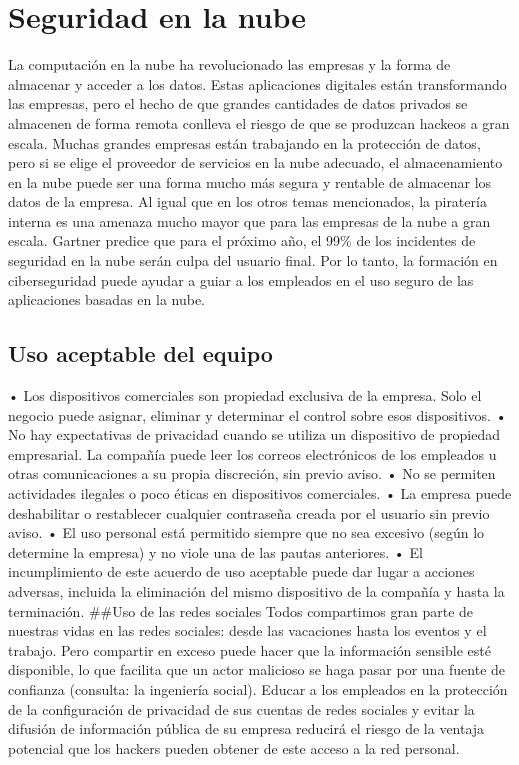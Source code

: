 \documentclass[
]{article}
\begin{document}
\hypertarget{seguridad-en-la-nube}{%
\section{Seguridad en la nube}\label{seguridad-en-la-nube}}

La computación en la nube ha revolucionado las empresas y la forma de almacenar y acceder a los datos. Estas aplicaciones digitales están transformando las empresas, pero el hecho de que grandes cantidades de datos privados se almacenen de forma remota conlleva el riesgo de que se produzcan hackeos a gran escala. Muchas grandes empresas están trabajando en la protección de datos, pero si se elige el proveedor de servicios en la nube adecuado, el almacenamiento en la nube puede ser una forma mucho más segura y rentable de almacenar los datos de la empresa.
Al igual que en los otros temas mencionados, la piratería interna es una amenaza mucho mayor que para las empresas de la nube a gran escala. Gartner predice que para el próximo año, el 99\% de los incidentes de seguridad en la nube serán culpa del usuario final. Por lo tanto, la formación en ciberseguridad puede ayudar a guiar a los empleados en el uso seguro de las aplicaciones basadas en la nube.

\hypertarget{uso-aceptable-del-equipo}{%
\subsection{Uso aceptable del equipo}\label{uso-aceptable-del-equipo}}

• Los dispositivos comerciales son propiedad exclusiva de la empresa. Solo el negocio puede asignar, eliminar y determinar el control sobre esos dispositivos.
• No hay expectativas de privacidad cuando se utiliza un dispositivo de propiedad empresarial. La compañía puede leer los correos electrónicos de los empleados u otras comunicaciones a su propia discreción, sin previo aviso.
• No se permiten actividades ilegales o poco éticas en dispositivos comerciales.
• La empresa puede deshabilitar o restablecer cualquier contraseña creada por el usuario sin previo aviso.
• El uso personal está permitido siempre que no sea excesivo (según lo determine la empresa) y no viole una de las pautas anteriores.
• El incumplimiento de este acuerdo de uso aceptable puede dar lugar a acciones adversas, incluida la eliminación del mismo dispositivo de la compañía y hasta la terminación.
\#\#Uso de las redes sociales
Todos compartimos gran parte de nuestras vidas en las redes sociales: desde las vacaciones hasta los eventos y el trabajo. Pero compartir en exceso puede hacer que la información sensible esté disponible, lo que facilita que un actor malicioso se haga pasar por una fuente de confianza (consulta: la ingeniería social).
Educar a los empleados en la protección de la configuración de privacidad de sus cuentas de redes sociales y evitar la difusión de información pública de su empresa reducirá el riesgo de la ventaja potencial que los hackers pueden obtener de este acceso a la red personal.
\end{document}
